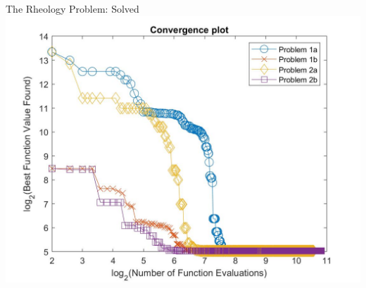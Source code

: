 \documentclass{beamer}
\begin{document}
\begin{frame}{The Rheology Problem: Solved}
	\centering
	\includegraphics[width=0.85\linewidth]{convergencePlot}
\end{frame}
\end{document}
